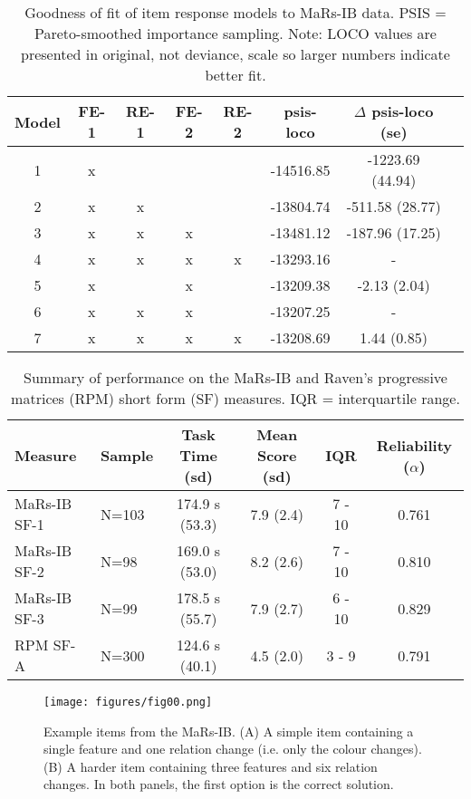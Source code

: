\documentclass[a4paper,man,natbib]{apa6}
\begin{document}
\begin{table}
    \centering
    \begin{tabular}{cccccccc}
    \toprule
    Model & FE-1 & RE-1 & FE-2 & RE-2 & psis-loco & $\Delta$ psis-loco (se) \\
    \midrule
    1 & x &   &   &   & -14516.85 & -1223.69 (44.94)\\
    2 & x & x &   &   & -13804.74 & -511.58 (28.77) \\
    3 & x & x & x &   & -13481.12 & -187.96 (17.25) \\
    4 & x & x & x & x & -13293.16 & - \\
    \midrule
    5 & x &   & x &   & -13209.38 & -2.13 (2.04) \\
    6 & x & x & x &   & -13207.25 & - \\
    7 & x & x & x & x & -13208.69 & 1.44 (0.85) \\
    \bottomrule
    \end{tabular}
    \caption{\label{tab:2} \normalfont Goodness of fit of item response models to MaRs-IB data. PSIS = Pareto-smoothed importance sampling. Note: LOCO values are presented in original, not deviance, scale so larger numbers indicate better fit.}
    \label{table:2}
\end{table}

\begin{table}
    \centering
    \begin{tabular*}{\textwidth}{llcccc}
    \toprule
    Measure & Sample & Task Time (sd) & Mean Score (sd) & IQR & Reliability ($\alpha$) \\
    \midrule
    MaRs-IB SF-1 & N=103 & 174.9 s (53.3) & 7.9 (2.4) & 7 - 10 & 0.761 \\
    MaRs-IB SF-2 & N=98  & 169.0 s (53.0) & 8.2 (2.6) & 7 - 10 & 0.810 \\
    MaRs-IB SF-3 & N=99  & 178.5 s (55.7) & 7.9 (2.7) & 6 - 10 & 0.829 \\
    RPM SF-A     & N=300 & 124.6 s (40.1) & 4.5 (2.0) & 3 - 9 & 0.791 \\
    \bottomrule
    \end{tabular*}
    \caption{\label{table:3} \normalfont Summary of performance on the MaRs-IB and Raven's progressive matrices (RPM) short form (SF) measures. IQR = interquartile range.}
\end{table}


\begin{figure}
\centering
\texttt{[image: figures/fig00.png]}
\caption{\label{fig:fig00} Example items from the MaRs-IB. (A) A simple item containing a single feature and one relation change (i.e. only the colour changes). (B) A harder item containing three features and six relation changes. In both panels, the first option is the correct solution.}
\end{figure}
\end{document}
